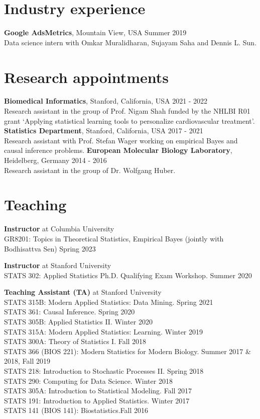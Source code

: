 \documentclass[margin,line]{res}
\newcommand{\ver}{\vspace*{-2.7mm}}
\begin{document}
\begin{resume}
\section{\sc Industry experience}
\textbf{Google AdsMetrics}, Mountain View, USA \hfill Summer 2019\\
Data science intern with Omkar Muralidharan, Sujayam Saha and Dennis L. Sun.


\section{\sc Research appointments}
{\bf Biomedical Informatics},  Stanford, California, USA \hfill 2021 - 2022\\
Research assistant in the group of Prof. Nigam Shah funded by the NHLBI R01 grant `Applying statistical learning tools to personalize cardiovascular treatment'.\\
{\bf Statistics Department},  Stanford, California, USA \hfill 2017 - 2021\\
Research assistant with Prof. Stefan Wager working on empirical Bayes and causal inference problems.
{\bf European Molecular Biology Laboratory},  Heidelberg, Germany \hfill 2014 - 2016\\
Research assistant in the group of Dr. Wolfgang Huber.



\section{\sc Teaching}
\textbf{Instructor} at Columbia University\\
GR8201: Topics in Theoretical Statistics, Empirical Bayes (jointly with Bodhisattva Sen) \hfill Spring 2023

\ver

\textbf{Instructor} at Stanford University\\
STATS 302: Applied Statistics Ph.D. Qualifying Exam Workshop. \hfill Summer 2020

\ver
\textbf{Teaching Assistant (TA)} at Stanford University\\
STATS 315B: Modern Applied Statistics: Data Mining. \hfill Spring 2021\\
STATS 361: Causal Inference. \hfill Spring 2020\\
STATS 305B: Applied Statistics II. \hfill Winter 2020\\
STATS 315A: Modern Applied Statistics: Learning. \hfill Winter 2019\\
STATS 300A: Theory of Statistics I. \hfill Fall 2018\\
STATS 366 (BIOS 221): Modern Statistics for Modern Biology. \hfill Summer 2017 \& 2018, Fall 2019\\
STATS 218: Introduction to Stochastic Processes II. \hfill Spring 2018\\
STATS 290: Computing for Data Science. \hfill Winter 2018\\
STATS 305A: Introduction to Statistical Modeling. \hfill Fall 2017\\
STATS 191: Introduction to Applied Statistics. \hfill Winter 2017\\
STATS 141 (BIOS 141): Biostatistics.\hfill Fall 2016


\end{resume}
\end{document}

